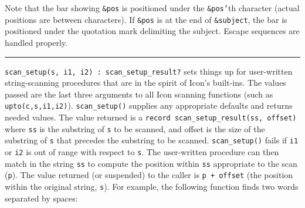 Note that the bar showing \texttt{\&pos} is positioned under the
\texttt{\&pos'}th character (actual positions are
between characters). If \texttt{\&pos} is at the end of
\texttt{\&subject}, the bar is positioned under the quotation mark
delimiting the subject. Escape sequences are handled properly. 



\vspace{0.25cm}\hrule{}

\texttt{scan\_setup(s, i1, i2) : scan\_setup\_result?} sets things up
for user-written string-scanning procedures that are in the spirit of
Icon's built-ins. The values passed are the last three
arguments to all Icon scanning functions (such as
\texttt{upto(c,s,i1,i2)}). \texttt{scan\_setup()} supplies any
appropriate defaults and returns needed values. The value returned is a
\texttt{record scan\_setup\_result(ss, offset)}
where \texttt{ss} is the substring of \texttt{s} to be scanned, and
offset is the size of the substring of \texttt{s} that precedes the
substring to be scanned. \texttt{scan\_setup()} fails if \texttt{i1} or
\texttt{i2} is out of range with respect to \texttt{s}. The
user-written procedure can then match in the string \texttt{ss} to
compute the position within \texttt{ss} appropriate to the scan
(\texttt{p}). The value returned (or suspended) to the caller is
\texttt{p + offset} (the position within the original string,
\texttt{s}). For example, the following function finds two words
separated by spaces:


